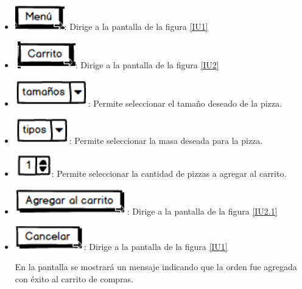	\begin{itemize}
		
		\item \includegraphics[scale=0.500]{imagenes/iconografia/Menu.png}: Dirige a la pantalla de la figura \ref{IU1}
		\item \includegraphics[scale=0.500]{imagenes/iconografia/Carrito.png}: Dirige a la pantalla de la figura \ref{IU2}
		\item \includegraphics[scale=0.500]{imagenes/iconografia/Tamanos.png}: Permite seleccionar el tamaño deseado de la pizza.
		\item \includegraphics[scale=0.500]{imagenes/iconografia/Tipos.png}: Permite seleccionar la masa deseada para la pizza.
		\item \includegraphics[scale=0.500]{imagenes/iconografia/Cantidad.png}: Permite seleccionar la cantidad de pizzas a agregar al carrito.
		\item \includegraphics[scale=0.500]{imagenes/iconografia/AgregarCarrito.png}: Dirige a la pantalla de la figura \ref{IU2.1}
		\item \includegraphics[scale=0.500]{imagenes/iconografia/Cancelar.png}: Dirige a la pantalla de la figura \ref{IU1}
		
		
		En la pantalla se mostrará un mensaje indicando que la orden fue agregada con éxito al carrito de compras.
		

\end{itemize}
